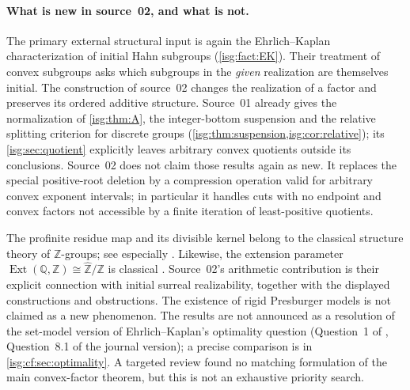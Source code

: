 \documentclass[11pt]{article}
\theoremstyle{definition}
\theoremstyle{remark}
\newcommand{\Z}{\mathbb{Z}}
\newcommand{\Q}{\mathbb{Q}}
\newcommand{\Zhat}{\widehat{\Z}}
\newcommand{\Ext}{\operatorname{Ext}}
\begin{document}
\paragraph{What is new in source~02, and what is not.} The primary external
structural input is again the Ehrlich--Kaplan characterization of initial
Hahn subgroups (\cref{isg:fact:EK}). Their treatment of convex subgroups
asks which subgroups in the \emph{given} realization are themselves
initial. The construction of source~02 changes the realization of a
factor and preserves its ordered additive structure. Source~01 already
gives the normalization of \cref{isg:thm:A}, the integer-bottom suspension
and the relative splitting criterion for discrete groups
(\cref{isg:thm:suspension,isg:cor:relative}); its \cref{isg:sec:quotient}
explicitly leaves arbitrary convex quotients outside its conclusions.
Source~02 does not claim those results again as new. It replaces the
special positive-root deletion by a compression operation valid for
arbitrary convex exponent intervals; in particular it handles cuts with no
endpoint and convex factors not accessible by a finite iteration of
least-positive quotients.

The profinite residue map and its divisible kernel belong to the
classical structure theory of $\Z$-groups; see especially
\cite[Sections~2 and~4]{Jerabek}. Likewise, the extension parameter
$\Ext(\Q,\Z)\cong\Zhat/\Z$ is classical \cite[Example~8.27]{Strickland}.
Source~02's arithmetic contribution is their explicit connection with
initial surreal realizability, together with the displayed constructions
and obstructions. The existence of rigid Presburger models is not claimed
as a new phenomenon. The results are not announced as a resolution of the
set-model version of Ehrlich--Kaplan's optimality question (Question~1 of
\cite{EK}, Question~8.1 of the journal version); a precise comparison is
in \cref{isg:cf:sec:optimality}. A targeted review found no matching
formulation of the main convex-factor theorem, but this is not an
exhaustive priority search.
\end{document}

